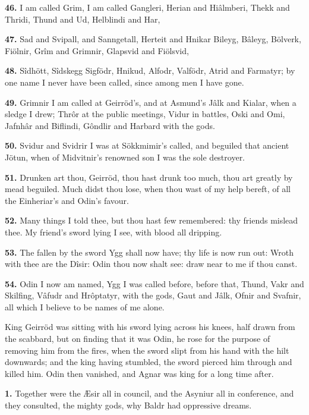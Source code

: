 \textbf{46.} I am called Grim, I am called Gangleri, Herian and Hiâlmberi,
Thekk and Thridi, Thund and Ud, Helblindi and Har,

\textbf{47.} Sad and Svipall, and Sanngetall, Herteit and Hnikar Bileyg,
Bâleyg, Bölverk, Fiölnir, Grîm and Grimnir, Glapsvid and Fiölsvid,

\textbf{48.} Sîdhött, Sîdskegg Sigfödr, Hnikud, Alfodr, Valfödr, Atrid and
Farmatyr; by one name I never have been called, since among men I have
gone.

\textbf{49.} Grimnir I am called at Geirröd's, and at Asmund's Jâlk and
Kialar, when a sledge I drew; Thrôr at the public meetings, Vidur in
battles, Oski and Omi, Jafnhâr and Biflindi, Gôndlir and Harbard with
the gods.

\textbf{50.} Svidur and Svidrir I was at Sökkmimir's called, and beguiled
that ancient Jötun, when of Midvitnir's renowned son I was the sole
destroyer.

\textbf{51.} Drunken art thou, Geirröd, thou hast drunk too much, thou art
greatly by mead beguiled. Much didst thou lose, when thou wast of my
help bereft, of all the Einheriar's and Odin's favour.

\textbf{52.} Many things I told thee, but thou hast few remembered: thy
friends mislead thee. My friend's sword lying I see, with blood all
dripping.

\textbf{53.} The fallen by the sword Ygg shall now have; thy life is now run
out: Wroth with thee are the Dîsir: Odin thou now shalt see: draw near
to me if thou canst.

\textbf{54.} Odin I now am named, Ygg I was called before, before that,
Thund, Vakr and Skilfing, Vâfudr and Hrôptatyr, with the gods, Gaut
and Jâlk, Ofnir and Svafnir, all which I believe to be names of me
alone.

King Geirröd was sitting with his sword lying across his knees, half
drawn from the scabbard, but on finding that it was Odin, he rose for
the purpose of removing him from the fires, when the sword slipt from
his hand with the hilt downwards; and the king having stumbled, the
sword pierced him through and killed him. Odin then vanished, and
Agnar was king for a long time after.


\textbf{1.} Together were the Æsir all in council, and the Asyniur all in
conference, and they consulted, the mighty gods, why Baldr had
oppressive dreams.

